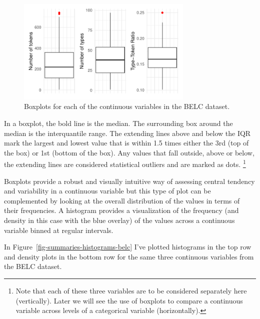 \documentclass[
  letterpaper,
]{latex/krantz}
\begin{document}
\begin{figure}[h]

{\centering \includegraphics[width=0.75\textwidth,height=\textheight]{approaching-analysis_files/figure-pdf/fig-summaries-boxplots-belc-1.pdf}

}

\caption{\label{fig-summaries-boxplots-belc}Boxplots for each of the
continuous variables in the BELC dataset.}

\end{figure}

In a boxplot, the bold line is the median. The surrounding box around
the median is the interquantile range. The extending lines above and
below the IQR mark the largest and lowest value that is within 1.5 times
either the 3rd (top of the box) or 1st (bottom of the box). Any values
that fall outside, above or below, the extending lines are considered
statistical outliers and are marked as dots. \footnote{Note that each of
  these three variables are to be considered separately here
  (vertically). Later we will see the use of boxplots to compare a
  continuous variable across levels of a categorical variable
  (horizontally).}

Boxplots provide a robust and visually intuitive way of assessing
central tendency and variability in a continuous variable but this type
of plot can be complemented by looking at the overall distribution of
the values in terms of their frequencies. A histogram provides a
visualization of the frequency (and density in this case with the blue
overlay) of the values across a continuous variable binned at regular
intervals.

In Figure~\ref{fig-summaries-histograms-belc} I've plotted histograms in
the top row and density plots in the bottom row for the same three
continuous variables from the BELC dataset.
\end{document}
